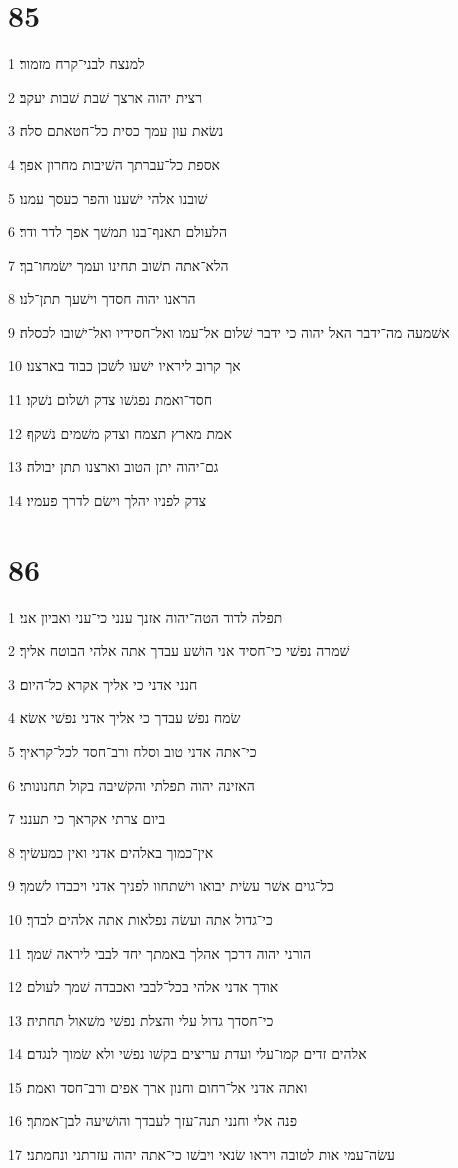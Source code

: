 \chapter{85}

\par 1 למנצח לבני־קרח מזמור׃
\par 2 רצית יהוה ארצך שׁבת שׁבות יעקב׃
\par 3 נשׂאת עון עמך כסית כל־חטאתם סלה׃
\par 4 אספת כל־עברתך השׁיבות מחרון אפך׃
\par 5 שׁובנו אלהי ישׁענו והפר כעסך עמנו׃
\par 6 הלעולם תאנף־בנו תמשׁך אפך לדר ודר׃
\par 7 הלא־אתה תשׁוב תחינו ועמך ישׂמחו־בך׃
\par 8 הראנו יהוה חסדך וישׁעך תתן־לנו׃
\par 9 אשׁמעה מה־ידבר האל יהוה כי ידבר שׁלום אל־עמו ואל־חסידיו ואל־ישׁובו לכסלה׃
\par 10 אך קרוב ליראיו ישׁעו לשׁכן כבוד בארצנו׃
\par 11 חסד־ואמת נפגשׁו צדק ושׁלום נשׁקו׃
\par 12 אמת מארץ תצמח וצדק משׁמים נשׁקף׃
\par 13 גם־יהוה יתן הטוב וארצנו תתן יבולה׃
\par 14 צדק לפניו יהלך וישׂם לדרך פעמיו׃

\chapter{86}

\par 1 תפלה לדוד הטה־יהוה אזנך ענני כי־עני ואביון אני׃
\par 2 שׁמרה נפשׁי כי־חסיד אני הושׁע עבדך אתה אלהי הבוטח אליך׃
\par 3 חנני אדני כי אליך אקרא כל־היום׃
\par 4 שׂמח נפשׁ עבדך כי אליך אדני נפשׁי אשׂא׃
\par 5 כי־אתה אדני טוב וסלח ורב־חסד לכל־קראיך׃
\par 6 האזינה יהוה תפלתי והקשׁיבה בקול תחנונותי׃
\par 7 ביום צרתי אקראך כי תענני׃
\par 8 אין־כמוך באלהים אדני ואין כמעשׂיך׃
\par 9 כל־גוים אשׁר עשׂית יבואו וישׁתחוו לפניך אדני ויכבדו לשׁמך׃
\par 10 כי־גדול אתה ועשׂה נפלאות אתה אלהים לבדך׃
\par 11 הורני יהוה דרכך אהלך באמתך יחד לבבי ליראה שׁמך׃
\par 12 אודך אדני אלהי בכל־לבבי ואכבדה שׁמך לעולם׃
\par 13 כי־חסדך גדול עלי והצלת נפשׁי משׁאול תחתיה׃
\par 14 אלהים זדים קמו־עלי ועדת עריצים בקשׁו נפשׁי ולא שׂמוך לנגדם׃
\par 15 ואתה אדני אל־רחום וחנון ארך אפים ורב־חסד ואמת׃
\par 16 פנה אלי וחנני תנה־עזך לעבדך והושׁיעה לבן־אמתך׃
\par 17 עשׂה־עמי אות לטובה ויראו שׂנאי ויבשׁו כי־אתה יהוה עזרתני ונחמתני׃

